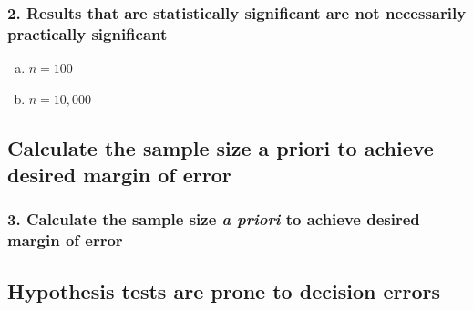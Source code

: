 \documentclass[11pt,containsverbatim,handout,xcolor=xelatex,dvipsnames,table]{beamer}
\newcommand{\solnMult}[1]{#1}
\newcommand{\soln}[1]{}
\begin{document}
\begin{frame}
\frametitle{2. Results that are statistically significant are not necessarily practically significant}


\begin{enumerate}[(a)]
\item $n = 100$
\item \solnMult{$n = 10,000$}
\end{enumerate}

\soln{\pause \pause
Suppose $\bar{x} = 5$, $s = 2$, $H_0: \mu = 4.5$, and $H_A: \mu \ge 4.5$.\\
\pause
{\small
\begin{eqnarray*}
Z_{n = 100} &=& \frac{5 - 4.5}{\frac{2}{\sqrt{100}}} \pause = \frac{5 - 4.5}{\frac{2}{10}} = \frac{0.5}{0.2} = 2.5,~~~\text{p-value} = 0.0062 \\
\pause
Z_{n = 10000} &=& \frac{5 - 4.5}{\frac{2}{\sqrt{10000}}} \pause = \frac{5 - 4.5}{\frac{2}{100}} = \frac{0.5}{0.02} = 25,~~~\text{p-value} \approx 0
\end{eqnarray*}
}
\pause
\begin{center}
As $n$ increases - $SE$ $\downarrow$, $Z$ $\uparrow$, p-value $\downarrow$
\end{center}
}

\end{frame}


\subsection{Calculate the sample size a priori to achieve desired margin of error}
\label{mi3dec}


\begin{frame}
\frametitle{3. Calculate the sample size \textit{a priori} to achieve desired margin of error}

\vfill


\vfill

\end{frame}


\subsection{Hypothesis tests are prone to decision errors}
\label{mi4dec}
\end{document}
